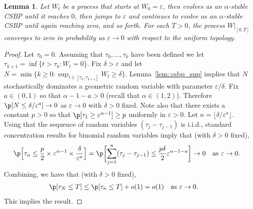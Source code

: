 \documentclass[JEP,XML,SOM,Unicode]{cedram}
\let\epsilon\varepsilon
\theoremstyle{plain}
\numberwithin{theorem}{section}
\newtheorem{lemma}[theorem]{Lemma}
\theoremstyle{definition}
\begin{document}
\begin{lemma}
\label{lem::noreflectedcsbp}
Let $W_t$ be a process that starts at $W_0 = \epsilon$, then evolves as an $\alpha$-stable CSBP until it reaches $0$, then jumps to $\epsilon$ and continues to evolve as an $\alpha$-stable CSBP until again reaching zero, and so forth. For each $T > 0$, the process $W|_{[0,T]}$ converges to zero in probability as $\epsilon \to 0$ with respect to the uniform topology.
\end{lemma}
\begin{proof}
Let $\tau_0 = 0$. Assuming that $\tau_0,\ldots,\tau_k$ have been defined we let $\tau_{k+1} = \inf\{t > \tau_k : W_t = 0\}$. Fix $\delta > \epsilon$ and let $N = \min\{k \geq 0 : \sup_{t \in [\tau_k,\tau_{k+1}]} W_t \geq \delta\}$. Lemma~\ref{lem::csbp_sup} implies that $N$ stochastically dominates a geometric random variable with parameter $\epsilon/\delta$. Fix $a \in (0,1)$ so that $\alpha-1-a>0$ (recall that $\alpha \in (1,2)$). Therefore $\p[ N \leq \delta/\epsilon^a] \to 0$ as $\epsilon \to 0$ with $\delta > 0$ fixed. Note also that there exists a constant $p > 0$ so that $\p[ \tau_1 \geq \epsilon^{\alpha-1}] \geq p$ uniformly in $\epsilon > 0$. Let $n = \lfloor \delta/\epsilon^a \rfloor$. Using that the sequence of random variables $(\tau_j-\tau_{j-1})$ is i.i.d., standard concentration results for binomial random variables imply that (with $\delta > 0$ fixed),
\[
\p\Bigl[ \tau_n \leq \frac{p}{2} \times \epsilon^{\alpha-1} \times \frac{\delta}{\epsilon^a} \Bigr] = \p\biggl[ \sum_{j=1}^n (\tau_j-\tau_{j-1}) \leq \frac{p \delta}{2} \epsilon^{\alpha-1-a} \biggr] \to 0 \quad\text{as $\textstyle \epsilon \to 0$}.
\]
Combining, we have that (with $\delta > 0$ fixed),
\begin{align*}
\p[ \tau_N \leq T]
&\leq \p[ \tau_n \leq T] + o(1) = o(1) \quad\text{as $\textstyle \epsilon \to 0$}.
\end{align*}
This implies the result.
\end{proof}
\end{document}
